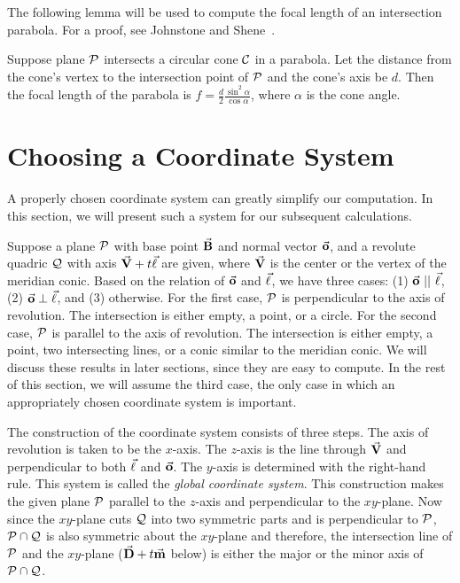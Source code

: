      The following lemma will be used to compute the focal length of an
intersection parabola.  For a proof, see Johnstone and
Shene~\cite{johnstone-shene:1991}.

\begin{lemma}
\label{lemma:cone-para-focal-length}
     Suppose plane ${\cal P}$ intersects a circular cone ${\cal C}$ in a
parabola.  Let the distance from the cone's vertex to the intersection point
of ${\cal P}$ and the cone's axis be $d$.  Then the focal length of the
parabola is $f=\frac{d}{2}\frac{\sin^2\alpha}{\cos\alpha}$, where $\alpha$ is
the cone angle.
\end{lemma}


\section{Choosing a Coordinate System}
\label{section:coordinate-system}

     A properly chosen coordinate system can greatly simplify our computation.
In this section,  we will present such a system for our subsequent
calculations.

     Suppose a plane ${\cal P}$ with base point $\vec{\bf B}$ and normal vector
$\vec{\bf o}$, and a revolute quadric ${\cal Q}$ with axis
$\vec{\bf V}+t\vec{\bf \ell}$ are given, where $\vec{\bf V}$ is the center or the
vertex of the meridian conic.
Based on the relation of $\vec{\bf o}$ and $\vec{\bf \ell}$, we have three cases:
(1) $\vec{\bf o}\ ||\ \vec{\bf \ell}$, (2) $\vec{\bf o}\perp\vec{\bf \ell}$, and
(3) otherwise.  For the first case, ${\cal P}$ is perpendicular to the
axis of revolution.  The intersection is either empty, a point, or a circle.
For the second case, ${\cal P}$ is parallel to the axis of revolution.  The
intersection is either empty, a point, two intersecting lines, or a conic
similar to the meridian conic.  We will discuss these results in later
sections, since they are easy to compute.  In the rest of this section,
we will assume the
third case, the only case in which an appropriately chosen coordinate system is
important.

     The construction of the coordinate system consists of three steps.
The axis of revolution is taken to be the $x$-axis.  The $z$-axis is the
line through $\vec{\bf V}$ and perpendicular to both $\vec{\bf \ell}$ and
$\vec{\bf o}$.  The $y$-axis is determined with the right-hand rule.
This system is called the {\em global coordinate system}.
This construction makes the given plane ${\cal P}$ parallel to the $z$-axis
and perpendicular to the $xy$-plane.  Now since the $xy$-plane cuts
${\cal Q}$ into two symmetric parts and is perpendicular to ${\cal P}$,
${\cal P}\cap{\cal Q}$ is also symmetric about the $xy$-plane and therefore,
the intersection line of ${\cal P}$ and the $xy$-plane
($\vec{\bf D}+t\vec{\bf m}$ below) is either the major or the minor axis of
${\cal P}\cap{\cal Q}$.

